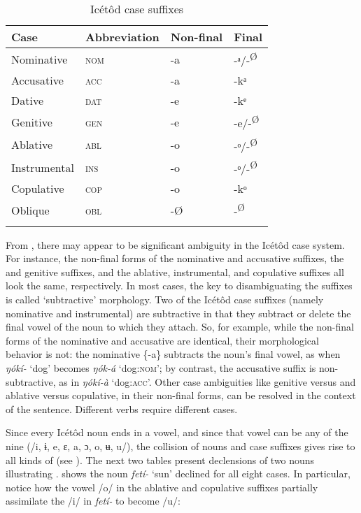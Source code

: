 \begin{table}
\caption{Icétôd case suffixes}
\label{tab:case:suffixes}


\begin{tabularx}{\textwidth}{XXXX}
\lsptoprule

Case & Abbreviation & Non-final & Final\\
\midrule
Nominative & \textsc{nom} & {}-a & {}-ᵃ/-\textsuperscript{Ø}\\
Accusative & \textsc{acc} & {}-a & {}-kᵃ\\
Dative & \textsc{dat} & {}-e & {}-kᵉ\\
Genitive & \textsc{gen} & {}-e & {}-e/-\textsuperscript{Ø}\\
Ablative & \textsc{abl} & {}-o & {}-ᵒ/-\textsuperscript{Ø}\\
Instrumental & \textsc{ins} & {}-o & {}-ᵒ/-\textsuperscript{Ø}\\
Copulative & \textsc{cop} & {}-o & {}-kᵒ\\
Oblique & \textsc{obl} & {}-Ø & {}-\textsuperscript{Ø}\\
\lspbottomrule
\end{tabularx}
\end{table}
From , there may appear to be significant ambiguity in the Icétôd case system. For instance, the non-final forms of the nominative and accusative suffixes, the  and genitive suffixes, and the ablative, instrumental, and copulative suffixes all look the same, respectively. In most cases, the key to disambiguating the suffixes is called ‘subtractive’ morphology. Two of the Icétôd case suffixes (namely nominative and instrumental) are subtractive in that they subtract or delete the final vowel of the noun to which they attach. So, for example, while the non-final forms of the nominative and accusative are identical, their morphological behavior is not: the nominative \{-a\} subtracts the noun’s final vowel, as when \textit{ŋókí-} ‘dog’ becomes \textit{ŋók-á} ‘dog:\textsc{nom}’; by contrast, the accusative suffix is non-subtractive, as in \textit{ŋókí-à} ‘dog:\textsc{acc}’. Other case ambiguities like genitive versus  and ablative versus copulative, in their non-final forms, can be resolved in the context of the sentence. Different verbs require different cases.

Since every Icétôd noun ends in a vowel, and since that vowel can be any of the nine (/i, ɨ, e, ɛ, a, ɔ, o, ʉ, u/), the collision of nouns and case suffixes gives rise to all kinds of  (see ). The next two tables present declensions of two nouns illustrating .  shows the noun \textit{fetí-} ‘sun’ declined for all eight cases. In particular, notice how the vowel /o/ in the ablative and copulative suffixes partially assimilate the /i/ in \textit{fetí-} to become /u/:


